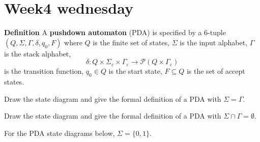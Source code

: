 \documentclass[12pt, oneside]{article}
\begin{document}
 \vfill
\section*{Week4 wednesday}



{\bf Definition} A {\bf pushdown automaton} (PDA) is  specified by a  $6$-tuple $(Q, \Sigma, \Gamma, \delta, q_0, F)$
where $Q$ is the finite set of states, $\Sigma$ is the input alphabet,  $\Gamma$ is the stack alphabet,
\[
    \delta: Q \times \Sigma_\varepsilon  \times  \Gamma_\varepsilon \to \mathcal{P}( Q \times \Gamma_\varepsilon)
\]
is the transition function,  $q_0 \in Q$ is the start state, $F \subseteq  Q$ is the set of accept states.


Draw the state diagram and give the formal definition of a PDA with $\Sigma = \Gamma$.

\vfill

Draw the state diagram and give the formal definition of a PDA with $\Sigma \cap \Gamma = \emptyset$.
    
\vfill

\newpage
For the PDA state diagrams below, $\Sigma = \{0,1\}$.
\end{document}
